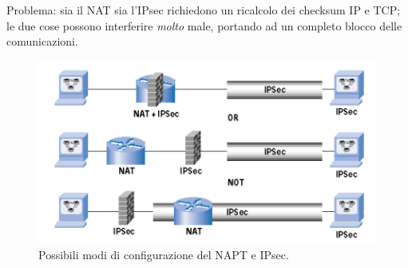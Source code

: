 Problema: sia il NAT sia l'IPsec richiedono un ricalcolo dei checksum IP e TCP; le due cose possono interferire \textit{molto} male, portando ad un completo blocco delle comunicazioni.
\begin{figure}[htbp]
	\centering
	\includegraphics[scale = 0.7]{images/NAPT-IPsec}
	\caption{Possibili modi di configurazione del NAPT e IPsec.}
	\label{img:NAPT-IPsec}
\end{figure}

